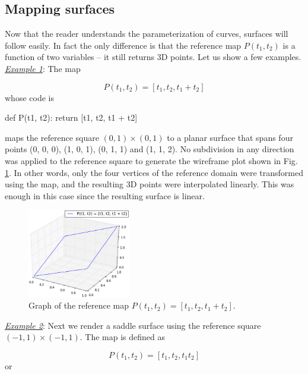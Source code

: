 \subsection{Mapping surfaces}

Now that the reader understands the parameterization of curves, surfaces will 
follow easily. In fact the only difference is that the reference map 
$P(t_1, t_2)$ is a function of two variables -- it still returns 3D points. 
Let us show a few examples.\\

\noindent
\underline{\em Example 1}: The map

$$
P(t_1, t_2) = [t_1, t_2, t_1 + t_2]
$$
\noindent
whose code is

\begin{bluecode}
def P(t1, t2):
    return [t1, t2, t1 + t2]
\end{bluecode}
maps the reference square $(0, 1)\times(0, 1)$ to a planar surface that spans
four points (0, 0, 0), (1, 0, 1), (0, 1, 1) and (1, 1, 2). No subdivision in
any direction was applied to the reference square to generate the wireframe plot 
shown in Fig. \ref{fig:paramsu1}. In other words, only the four vertices of the reference domain 
were transformed using the map, and the resulting 3D points were interpolated
linearly. This was enough in this case since the resulting surface is linear.

\begin{figure}[!ht]
\begin{center}
\includegraphics[width=0.4\textwidth]{img/paramsu1.png}
\end{center}
\vspace{-6mm}
\caption{Graph of the reference map $P(t_1, t_2) = [t_1, t_2, t_1 + t_2]$.}
\label{fig:paramsu1}
\end{figure}
\noindent

\noindent
\underline{\em Example 2}: Next we render a saddle surface
using the reference square $(-1, 1)\times(-1, 1)$. 
The map is defined as

$$
P(t_1, t_2) = [t_1, t_2, t_1 t_2]
$$
or


